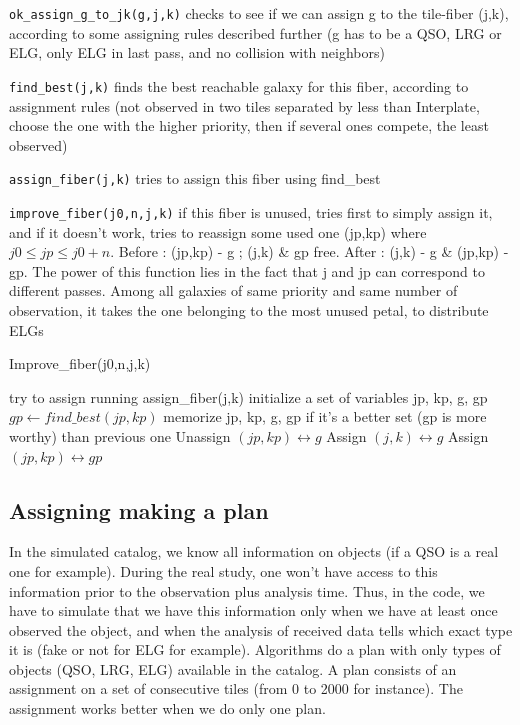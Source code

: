 \documentclass{article}
\begin{document}
{\tt ok\_assign\_g\_to\_jk(g,j,k)} checks to see if we can assign g to the tile-fiber (j,k), according to some assigning rules described further (g has to be a QSO, LRG or ELG, only ELG in last pass, and no collision with neighbors)

{\tt find\_best(j,k)} finds the best reachable galaxy for this fiber, according to assignment rules (not observed in two tiles separated by less than Interplate, choose the one with the higher priority, then if several ones compete, the least observed)

{\tt assign\_fiber(j,k)} tries to assign this fiber using find\_best

{\tt improve\_fiber(j0,n,j,k)} if this fiber is unused, tries first to simply assign it, and if it doesn't work, tries to reassign some used one (jp,kp) where $j0\le jp \le j0+n$. Before : (jp,kp) - g ; (j,k) \& gp free. After : (j,k) - g \& (jp,kp) - gp. The power of this function lies in the fact that j and jp can correspond to different passes. Among all galaxies of same priority and same number of observation, it takes the one belonging to the most unused petal, to distribute ELGs

\begin{algorithm}[H]
	\caption{Improve\_fiber(j0,n,j,k)}\label{euclid}
	\begin{algorithmic}[1]
		\State try to assign running assign\_fiber(j,k)
		\State initialize a set of variables jp, kp, g, gp
		\State $gp \leftarrow find\_best(jp,kp)$
		\State memorize jp, kp, g, gp if it's a better set (gp is more worthy) than previous one
		\EndFor
		\EndIf
		\EndFor
		\State Unassign $(jp,kp) \longleftrightarrow g$
		\State Assign $(j,k) \longleftrightarrow g$
		\State Assign $(jp,kp) \longleftrightarrow gp$
		\EndIf
		\EndIf
		\EndIf
	\end{algorithmic}
\end{algorithm}


\subsection{Assigning making a plan}
In the simulated catalog, we know all information on objects (if a QSO is a real one for example). During the real study, one won't have access to this information prior to the observation plus analysis time. Thus, in the code, we have to simulate that we have this information only when we have at least once observed the object, and when the analysis of received data tells which exact type it is (fake or not for ELG for example). Algorithms do a plan with only types of objects (QSO, LRG, ELG) available in the catalog. A plan consists of an assignment on a set of consecutive tiles (from 0 to 2000 for instance). The assignment works better when we do only one plan.
\end{document}
